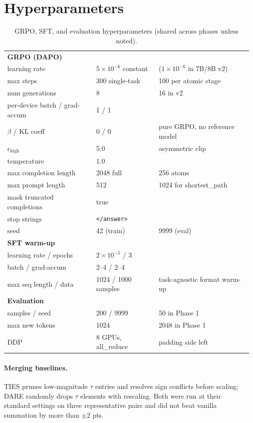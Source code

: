 \documentclass{article}
\newcommand{\tv}{\tau}
\begin{document}
\section{Hyperparameters}
\label{app:hparams}
\begin{table}[h]
\centering\small
\caption{GRPO, SFT, and evaluation hyperparameters (shared across phases unless noted).}
\begin{tabular}{lll}
\toprule
\multicolumn{2}{l}{\textbf{GRPO (DAPO)}} & \\
learning rate & $5\times10^{-6}$ constant & ($1\times10^{-6}$ in 7B/8B v2)\\
max steps & 300 single-task & 100 per atomic stage\\
num generations & 8 & 16 in v2\\
per-device batch / grad-accum & 1 / 1 & \\
$\beta$ / KL coeff & 0 / 0 & pure GRPO, no reference model\\
$\epsilon_{\mathrm{high}}$ & 5.0 & asymmetric clip\\
temperature & 1.0 & \\
max completion length & 2048 full & 256 atoms\\
max prompt length & 512 & 1024 for shortest\_path\\
mask truncated completions & true & \\
stop strings & \texttt{</answer>} & \\
seed & 42 (train) & 9999 (eval)\\
\midrule
\multicolumn{2}{l}{\textbf{SFT warm-up}} & \\
learning rate / epochs & $2\times10^{-5}$ / 3 & \\
batch / grad-accum & 2--4 / 2--4 & \\
max seq length / data & 1024 / 1000 samples & task-agnostic format warm-up\\
\midrule
\multicolumn{2}{l}{\textbf{Evaluation}} & \\
samples / seed & 200 / 9999 & 50 in Phase 1\\
max new tokens & 1024 & 2048 in Phase 1\\
DDP & 8 GPUs, all\_reduce & padding side left\\
\bottomrule
\end{tabular}
\end{table}

\paragraph{Merging baselines.} TIES \citep{yadav2023ties} prunes low-magnitude $\tv$ entries and
resolves sign conflicts before scaling; DARE \citep{yu2024dare} randomly drops $\tv$ elements with
rescaling. Both were run at their standard settings on three representative pairs and did not beat
vanilla summation by more than $\pm 2$ pts.
\end{document}

